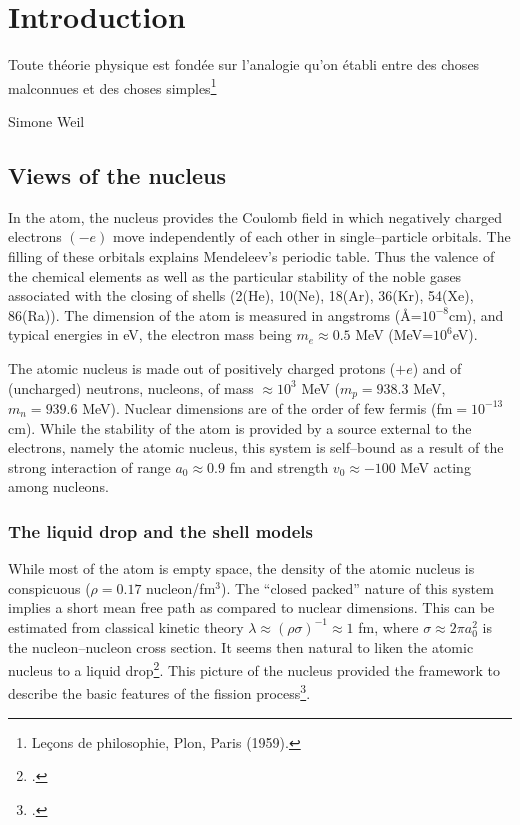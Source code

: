 	\chapter{Introduction}\label{introduction}
	 \epigraph{Toute th\'eorie physique est fond\'ee sur l'analogie qu'on \'etabli entre des choses malconnues et des choses simples\footnote{Le\c{c}ons de philosophie, Plon, Paris (1959).}}{Simone Weil}
\section{Views of the nucleus}
In the atom, the nucleus provides the Coulomb field in which negatively charged electrons $(-e)$ move independently of each other in single--particle orbitals. The filling of these orbitals explains Mendeleev's periodic table. Thus the valence of the chemical elements as well as the particular stability of the noble gases associated with the closing of shells (2(He), 10(Ne), 18(Ar), 36(Kr), 54(Xe), 86(Ra)). The dimension of the atom is measured in angstroms (\AA=$10^{-8}$cm), and typical energies in eV, the electron mass being $m_e\approx 0.5$ MeV (MeV=$10^6$eV).


The atomic nucleus is made out of positively charged protons ($+e$) and of (uncharged) neutrons, nucleons, of mass $\approx 10^3$ MeV ($m_p=938.3$ MeV, $m_n=939.6$ MeV). Nuclear dimensions are of the order of few fermis (fm$=10^{-13}$ cm). While the stability of the atom is provided by a source external to the electrons, namely the atomic nucleus, this system is  self--bound as a result of the strong interaction of range $a_0\approx 0.9$ fm and strength $v_0\approx -100$ MeV acting among nucleons. 
\subsection{The liquid drop and the shell models}\label{S1.1.1}
While most of the atom is empty space, the density of the atomic nucleus is conspicuous ($\rho=0.17$ nucleon/fm$^3$). The ``closed packed'' nature of this system implies a short mean free path as compared to nuclear dimensions. This can be estimated from classical kinetic theory $\lambda\approx(\rho\sigma)^{-1}\approx1$ fm, where $\sigma\approx 2\pi a_0^2$ is the nucleon--nucleon cross section. It seems then natural to liken the atomic nucleus to a liquid drop\footnote{\cite{Bohr:37}.}.
This picture of the nucleus provided the framework to describe the basic features of the fission process\footnote{\cite{Meitner:39,Bohr:39}.}. 



